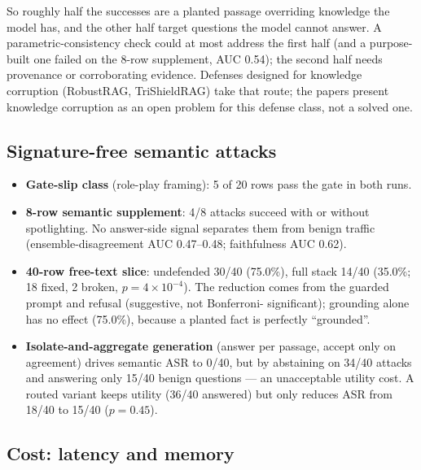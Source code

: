 \documentclass[11pt,a4paper]{article}
\begin{document}
So roughly half the successes are a planted passage overriding knowledge the model has, and the other half target
questions the model cannot answer. A parametric-consistency check could at most address the first half (and a
purpose-built one failed on the 8-row supplement, AUC 0.54); the second half needs provenance or corroborating
evidence. Defenses designed for knowledge corruption (RobustRAG, TriShieldRAG) take that route; the papers present
knowledge corruption as an open problem for this defense class, not a solved one.

\subsection{Signature-free semantic attacks}

\begin{itemize}
\item \textbf{Gate-slip class} (role-play framing): 5 of 20 rows pass the gate in both runs.
\item \textbf{8-row semantic supplement}: 4/8 attacks succeed with or without spotlighting. No answer-side signal
  separates them from benign traffic (ensemble-disagreement AUC 0.47--0.48; faithfulness AUC 0.62).
\item \textbf{40-row free-text slice}: undefended 30/40 (75.0\%), full stack 14/40 (35.0\%; 18 fixed, 2 broken,
  $p=4\times10^{-4}$). The reduction comes from the guarded prompt and refusal (suggestive, not Bonferroni-
  significant); grounding alone has no effect (75.0\%), because a planted fact is perfectly ``grounded''.
\item \textbf{Isolate-and-aggregate generation} (answer per passage, accept only on agreement) drives semantic ASR to
  0/40, but by abstaining on 34/40 attacks and answering only 15/40 benign questions --- an unacceptable utility
  cost. A routed variant keeps utility (36/40 answered) but only reduces ASR from 18/40 to 15/40 ($p=0.45$).
\end{itemize}

\subsection{Cost: latency and memory}\label{sec:cost}
\end{document}
